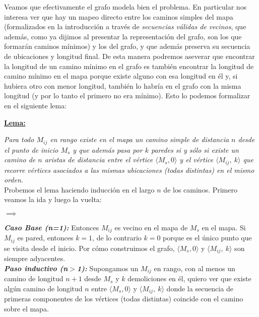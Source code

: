    Veamos que efectivamente el grafo modela bien el problema. En particular nos interesa ver que hay un mapeo directo entre los caminos simples del mapa (formalizados en la introducción a través de \emph{secuencias válidas de vecinos}, que además, como ya dijimos al presentar la representación del grafo, son los que formarán caminos mínimos) y los del grafo, y que además preserva su secuencia de ubicaciones y longitud final. De esta manera podremos aseverar que encontrar la longitud de un camino mínimo en el grafo es también encontrar la longitud de camino mínimo en el mapa porque existe alguno con esa longitud en él y, si hubiera otro con menor longitud, también lo habría en el grafo con la misma longitud (y por lo tanto el primero no era mínimo). Esto lo podemos formalizar en el siguiente lema:
    \\

    \begin{center}\textbf{\underline{Lema:} }\end{center}
        \textit{Para todo $M_{ij}$ en rango existe en el mapa un camino simple de distancia $n$ desde el punto de inicio $M_{s}$ y que además pasa por $k$ paredes si y sólo si existe un camino de $n$ aristas de distancia entre el vértice $\langle {M_s, 0} \rangle$ y el vértice $\langle {M_{ij},\ k} \rangle$  que recorre vértices asociados a las mismas ubicaciones (todas distintas) en el mismo orden.}
    \\

    Probemos el lema haciendo inducción en el largo $n$ de los caminos. Primero veamos la ida y luego la vuelta:

    \begin{center}$\mathbf{\implies}$\end{center}

    \textbf{\emph{Caso Base (n=1): }} Entonces $M_{ij}$ es vecino en el mapa de $M_s$ en el mapa. Si $M_{ij}$ es pared, entonces $k=1$, de lo contrario $k=0$ porque es el único punto que se visita desde el inicio. Por cómo construimos el grafo, $\langle {M_s, 0} \rangle$ y $\langle {M_{ij},\ k} \rangle$ son siempre adyacentes.
    \\

    \textbf{\emph{Paso inductivo (n$>$1): }} Supongamos un $M_{ij}$ en rango, con al menos un camino de longitud $n+1$ desde $M_s$ y $k$ demoliciones en él, quiero ver que existe algún camino de longitud $n$ entre $\langle {M_s, 0} \rangle$ y $\langle {M_{ij},\ k} \rangle$ donde la secuencia de primeras componentes de los vértices (todas distintas) coincide con el camino sobre el mapa.
    \\


